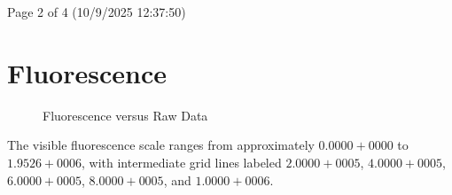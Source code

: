 \documentclass[UTF8,10pt,a4paper,fontset=fandol]{ctexart}
\begin{document}

\begin{flushleft}
Page 2 of 4 (10/9/2025 12:37:50)
\end{flushleft}

\newpage

\section*{Fluorescence}

\begin{figure}[ht]
\centering
\caption*{Fluorescence versus Raw Data}
\end{figure}

\noindent
The visible fluorescence scale ranges from approximately \(0.0000+0000\) to
\(1.9526+0006\), with intermediate grid lines labeled
\(2.0000+0005\), \(4.0000+0005\), \(6.0000+0005\),
\(8.0000+0005\), and \(1.0000+0006\).


\newpage
\end{document}
